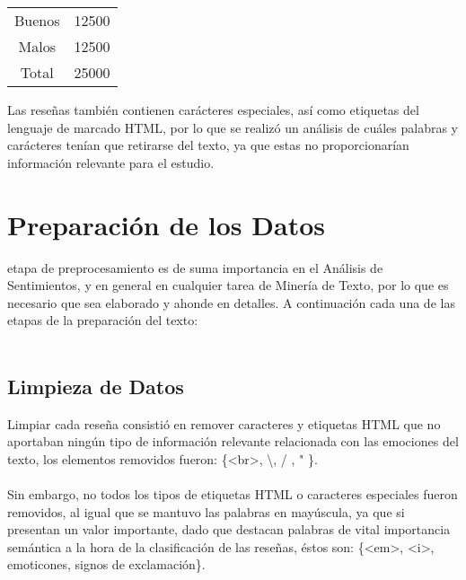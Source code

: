 \documentclass{sciposter}
\begin{document}
\begin{multicols}{3}
\begin{table}[h]
\centering
{}\label{tab:1}
\begin{tabular}{ |c|c| }
\hline
Buenos & 12500\\
Malos  & 12500\\
\hline
Total & 25000\\
\hline
\end{tabular}
\end{table}

Las reseñas tambi\'en contienen car\'acteres especiales, as\'i como etiquetas del lenguaje de marcado HTML, por lo que se realiz\'o un an\'alisis de cu\'ales palabras y car\'acteres ten\'ian que retirarse del texto, ya que estas no proporcionar\'ian informaci\'on relevante para el estudio.

\section{Preparaci\'on de los Datos}
 etapa de preprocesamiento es de suma importancia en el An\'alisis de Sentimientos, y en general en cualquier tarea de Miner\'ia de Texto, por lo que es necesario que sea elaborado y ahonde en detalles. A continuaci\'on cada una de las etapas de la preparaci\'on del texto:
\\\\
\subsection{Limpieza de Datos}
Limpiar cada reseña consisti\'o en remover caracteres y etiquetas HTML que no aportaban ning\'un tipo de informaci\'on relevante relacionada con las emociones del texto, los elementos removidos fueron: \{<br>, \textbackslash, / , " \}.
\\\\
Sin embargo, no todos los tipos de etiquetas HTML o caracteres especiales fueron removidos, al igual que se mantuvo las palabras en may\'uscula, ya que si presentan un valor importante, dado que destacan palabras de vital importancia sem\'antica a la hora de la clasificaci\'on de las reseñas, \'estos son: \{<em>, <i>, emoticones, signos de exclamaci\'on\}.
\\\\

\end{multicols}
\end{document}
